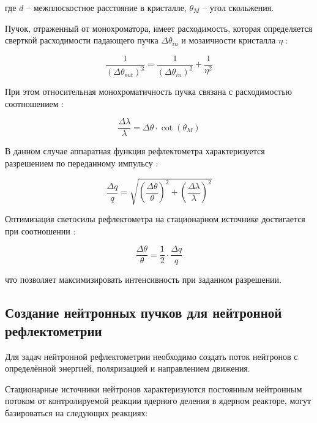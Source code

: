 \documentclass[a4paper]{article}
\begin{document}
где $d$ -- межплоскостное расстояние в кристалле, $\theta_M$ -- угол скольжения.

Пучок, отраженный от монохроматора, имеет расходимость, 
которая определяется сверткой расходимости падающего пучка $\Delta\theta_{in}$ и мозаичности кристалла $\eta$ \cite{15}:

\begin{equation}
\frac{1}{(\Delta\theta_{out})^2} = \frac{1}{(\Delta\theta_{in})^2} + \frac{1}{\eta^2}
\end{equation}

При этом относительная монохроматичность пучка связана с расходимостью соотношением \cite{15}:

\begin{equation}
\frac{\Delta\lambda}{\lambda} = \Delta\theta \cdot \cot(\theta_M)
\end{equation}

В данном случае аппаратная функция рефлектометра характеризуется разрешением по переданному импульсу \cite{15}:

\begin{equation}
\frac{\Delta q}{q} = \sqrt{\left(\frac{\Delta\theta}{\theta}\right)^2 + \left(\frac{\Delta\lambda}{\lambda}\right)^2}
\label{resolution_formula}
\end{equation}

Оптимизация светосилы рефлектометра на стационарном источнике достигается при соотношении \cite{15}:

\begin{equation}
\frac{\Delta\theta}{\theta} = \frac{1}{2} \cdot \frac{\Delta q}{q}
\end{equation}

что позволяет максимизировать интенсивность при заданном разрешении.

\subsection*{Создание нейтронных пучков для нейтронной рефлектометрии}

Для задач нейтронной рефлектометрии необходимо создать поток нейтронов с определённой энергией, поляризацией и направлением движения.

Стационарные источники нейтронов характеризуются постоянным нейтронным потоком от контролируемой реакции ядерного деления в ядерном реакторе, могут базироваться на следующих реакциях:
\end{document}
